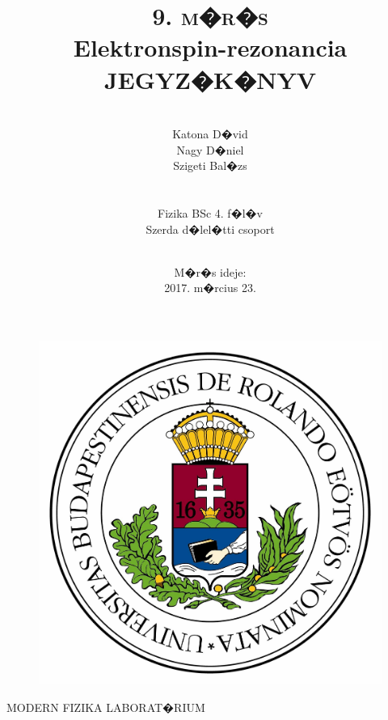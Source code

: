 \documentclass[a4paper,12pt]{article}
\begin{document}
        \begin{titlepage}
\author{\\ Katona D�vid  \\
Nagy D�niel \\
Szigeti Bal�zs \\\\\\
Fizika BSc 4. f�l�v\\
Szerda d�lel�tti csoport\\\\
}

\title{\textsc{9. m�r�s} \\
\huge{\textbf{Elektronspin-rezonancia}\\
\vspace{10pt}\textsc{JEGYZ�K�NYV}}}
\date{M�r�s ideje:\\2017. m�rcius 23. \\
}

\centering
\maketitle
        \thispagestyle{empty}

\begin{figure}[h!]
\centering
\includegraphics[scale=0.05]{eltelogo}
\end{figure}

\small{MODERN FIZIKA LABORAT�RIUM}
        \end{titlepage}
\end{document}

